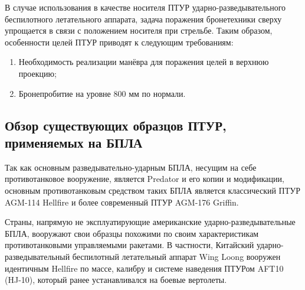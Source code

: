 В случае использования в качестве носителя ПТУР ударно-разведывательного беспилотного летательного аппарата, задача поражения бронетехники сверху упрощается в связи с положением носителя при стрельбе.
Таким образом, особенности целей ПТУР приводят к следующим требованиям:
\begin{enumerate}[1.]
	\item Необходимость реализации манёвра для поражения целей в верхнюю проекцию;
	\item Бронепробитие на уровне 800 мм по нормали.
\end{enumerate}

\clearpage
\subsection{Обзор существующих образцов ПТУР,\\применяемых на БПЛА}
Так как основным разведывательно-ударным БПЛА, несущим на себе противотанковое вооружение, является Predator и его копии и модификации, основным противотанковым средством таких БПЛА является классический ПТУР AGM-114 Hellfire и более современный ПТУР AGM-176 Griffin.

Страны, напрямую не эксплуатирующие американские ударно-разведывательные БПЛА, вооружают свои образцы похожими по своим характеристикам противотанковыми управляемыми ракетами. В частности, Китайский ударно-разведывательный беспилотный летательный аппарат Wing Loong вооружен идентичным Hellfire по массе, калибру и системе наведения ПТУРом AFT10 (HJ-10), который ранее устанавливался на боевые вертолеты.
